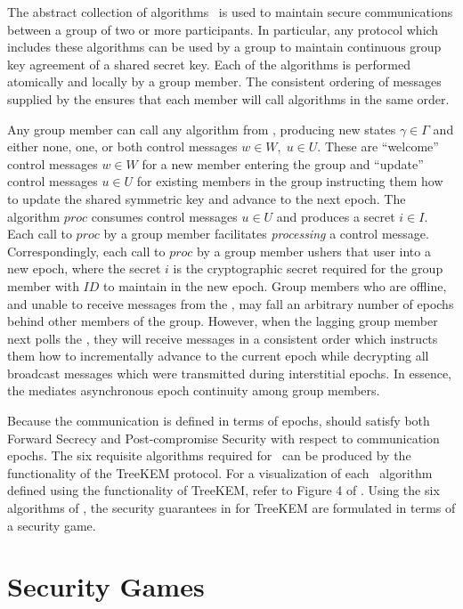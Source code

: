 The abstract collection of algorithms \CGKAdef\ is used to maintain secure communications between a group of two or more participants.
In particular, any protocol which includes these algorithms can be used by a group to maintain continuous group key agreement of a shared secret key.
Each of the algorithms is performed atomically and locally by a group member.
The consistent ordering of messages supplied by the  ensures that each member will call algorithms in the same order.

Any group member can call any algorithm from \CGKAdef, producing new states \(\gamma \in \Gamma\) and either none, one, or both control messages \(w \in W,\; u \in U\).
These are ``welcome'' control messages \(w \in W\) for a new member entering the group and ``update'' control messages \(u \in U\) for existing members in the group instructing them how to update the shared symmetric key and advance to the next epoch.
The algorithm \(proc\) consumes control messages \(u \in U\) and produces a secret \(i \in I\).
Each call to \(proc\) by a group member facilitates \emph{processing} a control message.
Correspondingly, each call to \(proc\) by a group member ushers that user into a new epoch, where the secret \(i\) is the cryptographic secret required for the group member with \(ID\) to maintain  in the new epoch.
Group members who are offline, and unable to receive messages from the , may fall an arbitrary number of epochs behind other members of the group.
However, when the lagging group member next polls the , they will receive messages in a consistent order which instructs them how to incrementally advance to the current epoch while decrypting all broadcast messages which were transmitted during interstitial epochs.
In essence, the  mediates asynchronous epoch continuity among group members.

Because the communication is defined in terms of epochs,  should satisfy both Forward Secrecy and Post-compromise Security with respect to communication epochs.
The six requisite algorithms required for \CGKAdef\ can be produced by the functionality of the TreeKEM protocol.
For a visualization of each \CGKAdef\ algorithm defined using the functionality of TreeKEM, refer to Figure 4 of \autocite{alwen2020security}.
Using the six algorithms of \CGKAdef, the security guarantees in for TreeKEM are formulated in terms of a security game.


\hypertarget{sec:security-games}{%
\section{Security Games}\label{sec:security-games}}

